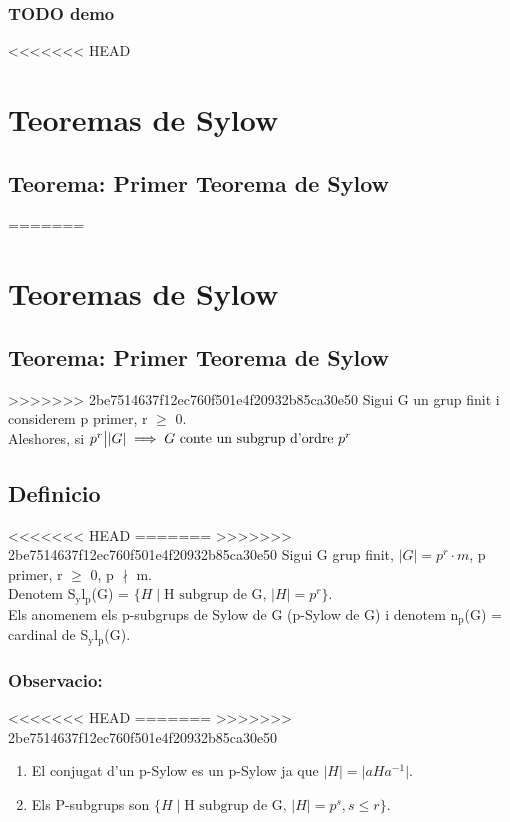 \documentclass[11pt]{article}
\begin{document}
\subsubsection{{\bfseries\sffamily TODO} demo}
<<<<<<< HEAD
\label{sec:org77dbda4}

\section{Teoremas de Sylow}
\label{sec:org5066f97}

\subsection{Teorema: Primer Teorema de Sylow}
\label{sec:org0509d91}
=======
\label{sec:org0f0c1f0}

\section{Teoremas de Sylow}
\label{sec:org417b051}

\subsection{Teorema: Primer Teorema de Sylow}
\label{sec:org28f015a}
>>>>>>> 2be7514637f12ec760f501e4f20932b85ca30e50
Sigui G un grup finit i considerem p primer, r \(\ge\) 0. \\
Aleshores, si \(p^r \big{|} \lvert G \rvert \implies G \text{ conte un subgrup d'ordre } p^r\)

\subsection{Definicio}
<<<<<<< HEAD
\label{sec:org64f7e04}
=======
\label{sec:orgb5d2795}
>>>>>>> 2be7514637f12ec760f501e4f20932b85ca30e50
Sigui G grup finit, \(\lvert G \rvert = p^r \cdot m\), p primer, r \(\ge\) 0, p \(\nmid\) m.\\
Denotem S\(_{\text{y}}\)l\(_{\text{p}}\)(G) = \(\{ H \mid \text{H subgrup de G, } \lvert H \rvert = p^r \}\). \\
Els anomenem els p-subgrups de Sylow de G (p-Sylow de G) i denotem n\(_{\text{p}}\)(G) = cardinal de S\(_{\text{y}}\)l\(_{\text{p}}\)(G).

\subsubsection{Observacio:}
<<<<<<< HEAD
\label{sec:org443eaa1}
=======
\label{sec:org990e8a1}
>>>>>>> 2be7514637f12ec760f501e4f20932b85ca30e50
\begin{enumerate}
\item El conjugat d'un p-Sylow es un p-Sylow ja que \(\lvert H \rvert = \lvert aHa^{-1} \rvert\).
\item Els P-subgrups son  \(\{ H \mid \text{H subgrup de G, } \lvert H \rvert = p^s, s \leq r \}\).
\end{enumerate}
\end{document}
